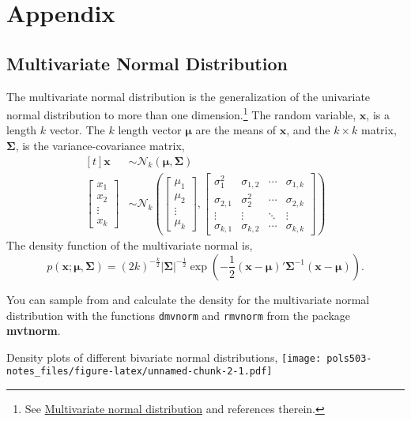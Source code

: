 \documentclass[]{book}
\let\rmarkdownfootnote\footnote%
\def\footnote{\protect\rmarkdownfootnote}
\newcommand{\mat}[1]{\boldsymbol{#1}}
\renewcommand{\vec}[1]{\boldsymbol{#1}}
\renewcommand{\T}{'}
\newcommand{\distr}[1]{\mathcal{#1}}
\newcommand{\dmvnorm}[1]{\distr{N}_{#1}}
\begin{document}
\chapter{Appendix}\label{appendix}

\section{Multivariate Normal
Distribution}\label{multivariate-normal-distribution}

The multivariate normal distribution is the generalization of the
univariate normal distribution to more than one dimension.\footnote{See
  \href{https://en.wikipedia.org/wiki/Multivariate_normal_distribution}{Multivariate
  normal distribution} and references therein.} The random variable,
\(\vec{x}\), is a length \(k\) vector. The \(k\) length vector
\(\vec{\mu}\) are the means of \(\vec{x}\), and the \(k \times k\)
matrix, \(\mat{\Sigma}\), is the variance-covariance matrix, \[
\begin{aligned}[t]
\vec{x} &\sim \dmvnorm{k}\left(\vec{\mu}, \mat{\Sigma} \right) \\
\begin{bmatrix}
x_1 \\
x_2 \\
\vdots \\
x_k
\end{bmatrix}
& \sim
\dmvnorm{k}
\left(
  \begin{bmatrix}
  \mu_1 \\
  \mu_2 \\
  \vdots \\
  \mu_k
  \end{bmatrix},
  \begin{bmatrix}
  \sigma_1^2 & \sigma_{1,2} & \cdots & \sigma_{1, k} \\
  \sigma_{2,1} & \sigma_2^2 & \cdots & \sigma_{2, k} \\
  \vdots & \vdots & \ddots & \vdots \\
  \sigma_{k,1} & \sigma_{k,2} & \cdots & \sigma_{k, k}
  \end{bmatrix}
\right)
\end{aligned}
\] The density function of the multivariate normal is, \[
p(\vec{x}; \vec{\mu}, \mat{\Sigma}) =
(2 k)^{-\frac{k}{2}}
\left| \mat{\Sigma} \right|^{-\frac{1}{2}}
\exp \left( -\frac{1}{2} (\vec{x} - \vec{\mu})\T \mat{\Sigma}^{-1} (\vec{x} - \vec{\mu}) \right) .
\]

You can sample from and calculate the density for the multivariate
normal distribution with the functions \texttt{dmvnorm} and
\texttt{rmvnorm} from the package \textbf{mvtnorm}.

Density plots of different bivariate normal distributions,
\texttt{[image: pols503-notes\_files/figure-latex/unnamed-chunk-2-1.pdf]}

\hypertarget{refs}{}
\end{document}
